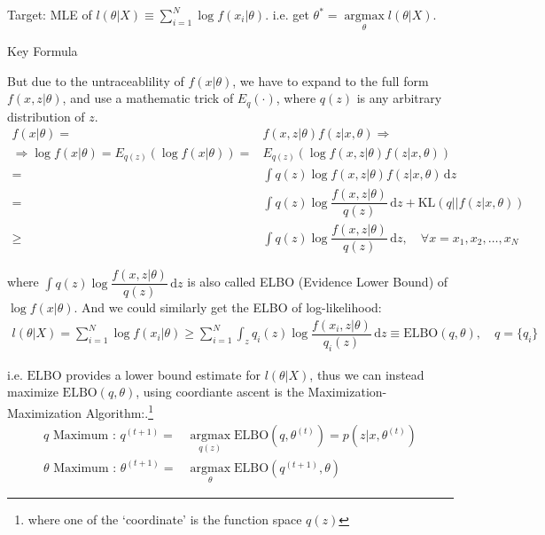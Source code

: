     Target: MLE of $ l(\theta|X)\equiv \sum_{i=1}^N\log f(x_i|\theta) $. i.e. get $ \theta ^*=\mathop{\arg\max}\limits_{\theta} l(\theta|X) $. 
    
\begin{point}
    Key Formula
\end{point}

    But due to the untraceablility of $ f(x|\theta ) $, we have to expand to the full form $ f(x,z|\theta) $, and use a mathematic trick of $ E_q(\cdot) $, where $ q(z) $ is any arbitrary distribution of $ z $. 
\begin{align}
    f(x|\theta )=&f(x,z|\theta )f(z|x,\theta )\Rightarrow \\
    \Rightarrow \log f(x|\theta )=E_{q(z)}\left(\log f(x|\theta )\right)=&E_{q(z)}\left(\log f(x,z|\theta )f(z|x,\theta )\right)\\
    =&\int q(z)\log f(x,z|\theta )f(z|x,\theta ) \,\mathrm{d}z\\
    =&\int q(z)\log \dfrac{f(x,z|\theta )}{q(z)} \,\mathrm{d}z +\mathrm{KL}\left(q||f(z|x,\theta )\right) \\
    \geq&\int q(z) \log \dfrac{f(x,z|\theta )}{q(z)}\,\mathrm{d}z ,\quad \forall x=x_1,x_2,\ldots,x_N
\end{align}

    where $ \displaystyle\int q(z)\log \dfrac{f(x,z|\theta )}{q(z)} \,\mathrm{d}z  $ is also called ELBO (Evidence Lower Bound) of $ \log f(x|\theta ) $. And we could similarly get the ELBO of log-likelihood:
    \begin{align}
        l(\theta |X)=\sum_{i=1}^N\log f(x_i|\theta )\geq \sum_{i=1}^N\int_z q_i(z)\log\dfrac{f(x_i,z|\theta )}{q_i(z)} \,\mathrm{d}z\equiv \mathrm{ELBO}(q,\theta ),\quad q=\{q_i\}
    \end{align}
    
    i.e. $ \mathrm{ELBO}  $ provides a lower bound estimate for $ l(\theta |X) $, thus we can instead maximize $ \mathrm{ELBO}(q,\theta)  $, using coordiante ascent is the Maximization-Maximization Algorithm:.\footnote{where one of the `coordinate' is the function space $ q(z) $}
\begin{align}
        q\text{ Maximum : }q^{(t+1)}=&\mathop{\arg\max}\limits_{q(z)}\mathrm{ELBO}(q,\theta ^{(t)})=p(z|x,\theta ^{(t)})\\
        \theta \text{ Maximum : }\theta ^{(t+1)}=&\mathop{\arg\max}\limits_{\theta }\mathrm{ELBO} (q^{(t+1)},\theta ) 
\end{align}

